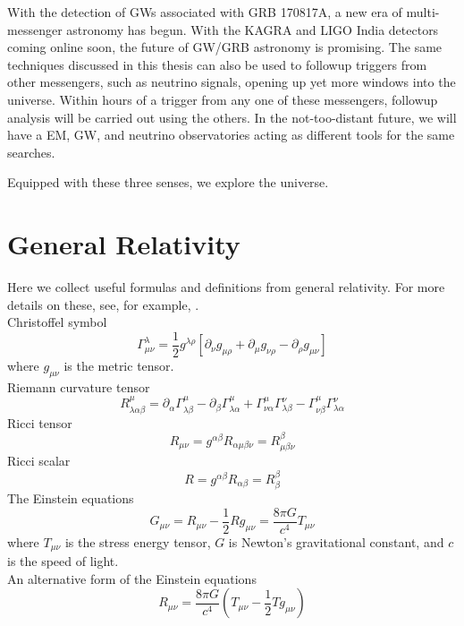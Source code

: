 \documentclass[11pt]{cuthesis}
\newcommand{\mn}{_{\mu\nu}}
\begin{document}
With the detection of GWs associated with GRB 170817A, a new era of multi-messenger astronomy has begun. With the KAGRA and LIGO India detectors coming online soon, the future of GW/GRB astronomy is promising. The same techniques discussed in this thesis can also be used to followup triggers from other messengers, such as neutrino signals, opening up yet more windows into the universe. Within hours of a trigger from any one of these messengers, followup analysis will be carried out using the others. In the not-too-distant future, we will have a EM, GW, and neutrino observatories acting as different tools for the same searches. 
\begin{center}

Equipped with these three senses, we explore the universe.

\end{center}


\appendix
\appendixpage
\addappheadtotoc
\chapter{General Relativity} \label{appendix:gr}
Here we collect useful formulas and definitions from general relativity. For more details on these, see, for example, \cite{carroll-spacetime,zee-einstein}.
\\
Christoffel symbol
\begin{equation} \label{christ}
\Gamma^\lambda\mn=\frac{1}{2}g^{\lambda \rho} [\partial_\nu g_{\mu \rho} + \partial_\mu g_{\nu \rho}-\partial_\rho g\mn]
\end{equation}
where $g\mn$ is the metric tensor. \\
Riemann curvature tensor  
\begin{equation} \label{rct}
R^\mu_{\lambda \alpha \beta} = \partial_\alpha \Gamma^\mu_{\lambda \beta} -\partial_\beta \Gamma^\mu_{\lambda \alpha} + \Gamma^\mu_{\nu \alpha} \Gamma^\nu_{\lambda \beta} - \Gamma^\mu_{\nu \beta} \Gamma^\nu_{\lambda \alpha}
\end{equation}
Ricci tensor
\begin{equation} \label{rt}
R\mn=g^{\alpha \beta} R_{\alpha \mu \beta \nu}=R^\beta_{\mu \beta \nu}
\end{equation}
Ricci scalar
\begin{equation} \label{rs}
R=g^{\alpha \beta}R_{\alpha \beta}=R^\beta_\beta
\end{equation}
The Einstein equations
\begin{equation} \label{eineq}
G\mn =R\mn -\frac{1}{2} R g\mn=\frac{8 \pi G}{c^4}T\mn
\end{equation}
where $T\mn$ is the stress energy tensor, $G$ is Newton's gravitational constant, and $c$ is the speed of light. \\
An alternative form of the Einstein equations
\begin{equation} \label{alt einstein}
R\mn = \frac{8 \pi G}{c^4}\left( T\mn - \frac{1}{2}Tg\mn \right) 
\end{equation}
\end{document}
